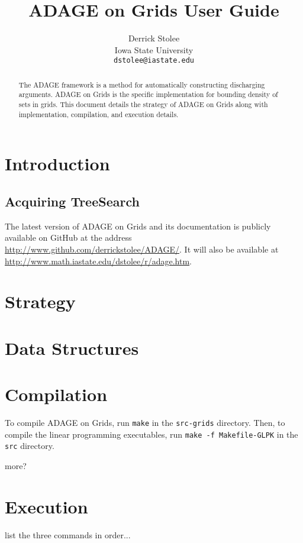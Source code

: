 \documentclass[11pt]{article}
\title{ADAGE on Grids User Guide}
\author{Derrick Stolee \\ 
	Iowa State University\\
	\texttt{dstolee@iastate.edu}
       }
\def\TreeSearch{{TreeSearch}}
\begin{document}
\maketitle
\vspace{-.3in}
\begin{abstract}
	The ADAGE framework is a method for automatically constructing discharging arguments.
	ADAGE on Grids is the specific implementation for bounding density of sets in grids.
	This document details the strategy of ADAGE on Grids along with implementation, compilation, and execution details.
\end{abstract}

\section{Introduction}
\label{sec:Introduction}


\subsection{Acquiring \TreeSearch}

The latest version of ADAGE on Grids and its documentation is publicly available on GitHub \cite{github} at the address \href{http://www.github.com/derrickstolee/ADAGE/}{http://www.github.com/derrickstolee/ADAGE/}.
It will also be available at \url{http://www.math.iastate.edu/dstolee/r/adage.htm}.

\section{Strategy}
\label{sec:Strategy}







\section{Data Structures}
\label{sec:structures}
	

	

\section{Compilation}
\label{sec:Compilation}

To compile ADAGE on Grids, run \texttt{make} in the \texttt{src-grids} directory.
Then, to compile the linear programming executables, run \texttt{make -f Makefile-GLPK} in the \texttt{src} directory.

more?

\section{Execution}
\label{sec:Execution}

list the three commands in order...
\end{document}
